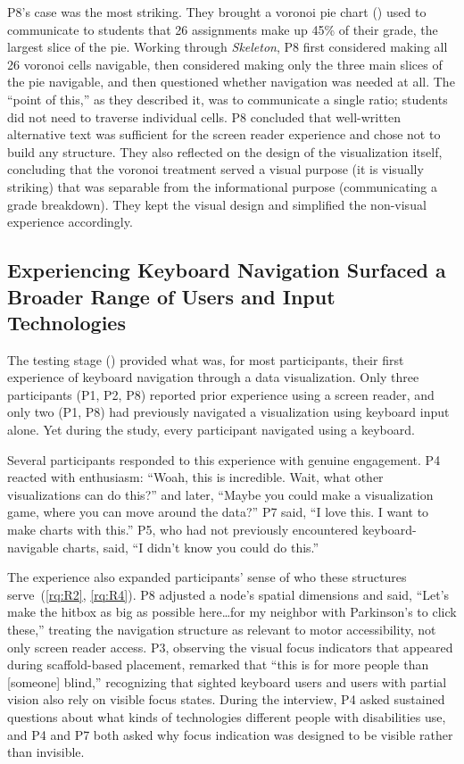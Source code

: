 \documentclass[12pt]{cmuthesis}
\begin{document}
P8's case was the most striking. They brought a voronoi pie chart () used to communicate to students that 26 assignments make up 45\% of their grade, the largest slice of the pie. Working through \textit{Skeleton}, P8 first considered making all 26 voronoi cells navigable, then considered making only the three main slices of the pie navigable, and then questioned whether navigation was needed at all. The ``point of this,'' as they described it, was to communicate a single ratio; students did not need to traverse individual cells. P8 concluded that well-written alternative text was sufficient for the screen reader experience and chose not to build any structure. They also reflected on the design of the visualization itself, concluding that the voronoi treatment served a visual purpose (it is visually striking) that was separable from the informational purpose (communicating a grade breakdown). They kept the visual design and simplified the non-visual experience accordingly.

\subsection{Experiencing Keyboard Navigation Surfaced a Broader Range of Users and Input Technologies}
\label{sec:results-keyboard}

The testing stage () provided what was, for most participants, their first experience of keyboard navigation through a data visualization. Only three participants (P1, P2, P8) reported prior experience using a screen reader, and only two (P1, P8) had previously navigated a visualization using keyboard input alone. Yet during the study, every participant navigated using a keyboard.

Several participants responded to this experience with genuine engagement. P4 reacted with enthusiasm: ``Woah, this is incredible. Wait, what other visualizations can do this?'' and later, ``Maybe you could make a visualization game, where you can move around the data?'' P7 said, ``I love this. I want to make charts with this.'' P5, who had not previously encountered keyboard-navigable charts, said, ``I didn't know you could do this.''

The experience also expanded participants' sense of who these structures serve~(\ref{rq:R2}, \ref{rq:R4}). P8 adjusted a node's spatial dimensions and said, ``Let's make the hitbox as big as possible here\ldots for my neighbor with Parkinson's to click these,'' treating the navigation structure as relevant to motor accessibility, not only screen reader access. P3, observing the visual focus indicators that appeared during scaffold-based placement, remarked that ``this is for more people than [someone] blind,'' recognizing that sighted keyboard users and users with partial vision also rely on visible focus states. During the interview, P4 asked sustained questions about what kinds of technologies different people with disabilities use, and P4 and P7 both asked why focus indication was designed to be visible rather than invisible.
\end{document}
